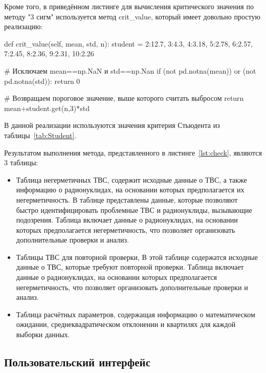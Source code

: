 Кроме того, в приведённом листинге для вычисления критического значения по методу "3 сигм" используется метод crit\_value, который имеет довольно простую реализацию:

\begin{flushleft}
 \label{lst:сrit_value}
\begin{MyCodes}
	
def crit_value(self, mean, std, n):
	student = {2:12.7, 3:4.3, 4:3.18, 5:2.78, 6:2.57, 7:2.45,
		8:2.36, 9:2.31, 10:2.26}
	
	# Исключаем mean==np.NaN и std==np.Nan
	if (not pd.notna(mean)) or (not pd.notna(std)): return 0
	
	# Возвращаем пороговое значение, выше которого считать выбросом
	return mean+student.get(n,3)*std
	
\end{MyCodes}
\end{flushleft}

В данной реализации используются значения критерия Стьюдента из таблицы~\ref{tab:Student}.

Результатом выполнения метода, представленного в листинге~\ref{lst:check}, являются 3 таблицы:

\begin{itemize}
	\item Таблица негерметичных ТВС, содержит исходные данные о ТВС, а также информацию о радионуклидах, на основании которых предполагается их негерметичность. В таблице представлены данные, которые позволяют быстро идентифицировать проблемные ТВС и радионуклиды, вызывающие подозрения. Таблица включает данные о радионуклидах, на основании которых предполагается негерметичность, что позволяет организовать дополнительные проверки и анализ. 
	
	\item Таблицы ТВС для повторной проверки, В этой таблице содержатся исходные данные о ТВС, которые требуют повторной проверки. Таблица включает данные о радионуклидах, на основании которых предполагается негерметичность, что позволяет организовать дополнительные проверки и анализ. 
	
	\item Таблица расчётных параметров, содержащая информацию о математическом ожидании, среднеквадратическом отклонении и квартилях для каждой выборки данных.
\end{itemize}

\subsection{Пользовательский интерфейс}

